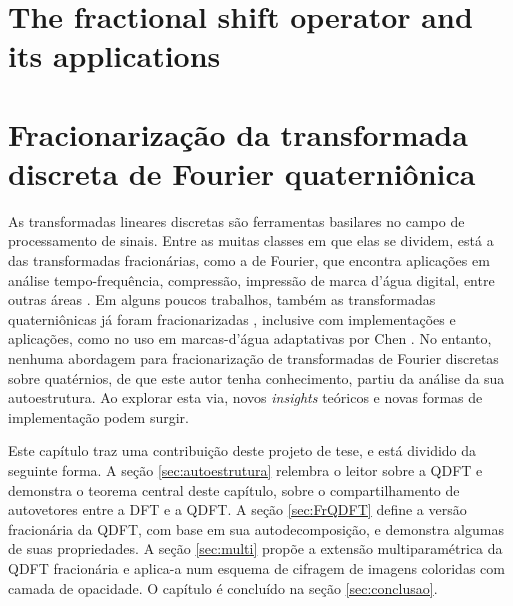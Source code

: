 \chapter{The fractional shift operator and its applications}
\label{ch:fracGFT}


\chapter[Fracionariza\c c\~ao da QDFT]{Fracionariza\c c\~ao da transformada discreta de Fourier quaterni\^onica}
\label{ch:FrQDFT}

As transformadas lineares discretas s\~ao ferramentas basilares no campo de processamento de sinais. Entre as muitas classes em que elas se dividem, est\'a a das transformadas fracion\'arias, como a de Fourier, que encontra aplica\c c\~oes em an\'alise tempo-frequ\^encia, compress\~ao, impress\~ao de marca d'\'agua digital, entre outras \'areas \cite{bultheel2002shattered}. Em alguns poucos trabalhos, tamb\'em as transformadas quaterni\^onicas j\'a foram fracionarizadas
\cite{guanlei2008fractional, wei2013different, roopkumar2016quaternionic}, inclusive com implementa\c c\~oes e aplica\c c\~oes, como no uso em marcas-d'\'agua adaptativas por Chen
\cite{chen2018quaternion}. No entanto, nenhuma abordagem para fracionariza\c c\~ao de transformadas de Fourier discretas sobre quat\'ernios, de que este autor tenha conhecimento, partiu da an\'alise da sua autoestrutura. Ao explorar esta via, novos \textit{insights} te\'oricos e novas formas de implementa\c c\~ao podem surgir.

Este cap\'itulo traz uma contribui\c c\~ao deste projeto de tese, e est\'a dividido da seguinte forma.
A se\c c\~ao \ref{sec:autoestrutura} relembra o leitor sobre a QDFT e demonstra o teorema central deste cap\'itulo, sobre o compartilhamento de autovetores entre a DFT e a QDFT. A se\c c\~ao \ref{sec:FrQDFT} define a vers\~ao fracion\'aria da QDFT, com base em sua autodecomposi\c c\~ao, e demonstra algumas de suas propriedades. A se\c c\~ao \ref{sec:multi} prop\~oe a extens\~ao multiparam\'etrica da QDFT fracion\'aria e aplica-a num esquema de cifragem de imagens coloridas com camada de opacidade. O cap\'itulo \'e conclu\'ido na se\c c\~ao \ref{sec:conclusao}.


